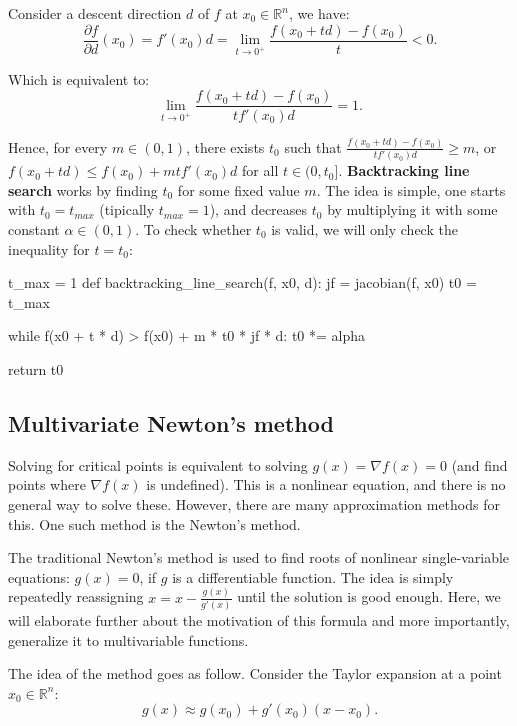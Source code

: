 Consider a descent direction \( d \) of \( f \) at \( x_{0} \in \mathbb{R}^{n}
\), we have:
\[
  \frac{\partial f}{\partial d}(x_{0}) = f'(x_{0})d = \lim_{t \to  0^{+}}
  \frac{f(x_{0} + t d) - f(x_{0})}{t} < 0
.\] 

Which is equivalent to:
\[
  \lim_{t \to  0^{+}}  \frac{f(x_{0} + t d) - f(x_{0})}{tf'(x_{0})d} = 1
.\]

Hence, for every \( m \in (0, 1) \), there exists \( t_{0} \) such that \(
\frac{f(x_{0} + t d) -f(x_{0})}{tf'(x_{0})d} \ge  m \), or \( f(x_{0} + t d) \le 
f(x_{0}) + mt f'(x_{0})d \) for all \( t \in (0, t_{0}] \). \textbf{Backtracking
line search} works by finding \( t_{0} \) for some fixed value \( m \). The idea
is simple, one starts with \( t_{0} = t_{max} \) (tipically \( t_{max} = 1 \)), and
decreases \( t_{0} \) by multiplying it with some constant \( \alpha \in (0, 1)
\). To check whether \( t_{0} \) is valid, we will only check the inequality for
\( t = t_{0} \):
\begin{python}
t_max = 1
def backtracking_line_search(f, x0, d):
  jf = jacobian(f, x0)
  t0 = t_max

  while f(x0 + t * d) > f(x0) + m * t0 * jf * d:
    t0 *= alpha

  return t0
\end{python}


\subsection{Multivariate Newton's method} %
\label{sub:Multivariate Newton's method}

Solving for critical points is equivalent to solving \( g(x) = \nabla f(x) = 0 \) (and
find points where \( \nabla f(x) \) is undefined). This is a nonlinear equation,
and there is no general way to solve these. However, there are many
approximation methods for this. One such method is the Newton's method.

The traditional Newton's method is used to find roots of nonlinear
single-variable equations: \( g(x) = 0 \), if \( g \) is a differentiable
function. The idea is simply repeatedly reassigning \( x = x -
\frac{g(x)}{g'(x)} \) until the solution is good enough. Here, we will elaborate
further about the motivation of this formula and more importantly, generalize it
to multivariable functions.

The idea of the method goes as follow. Consider the Taylor expansion at a point
\( x_{0} \in \mathbb{R}^{n} \):
\[
  g(x) \approx g(x_{0}) + g'(x_{0})(x - x_{0})
.\]

